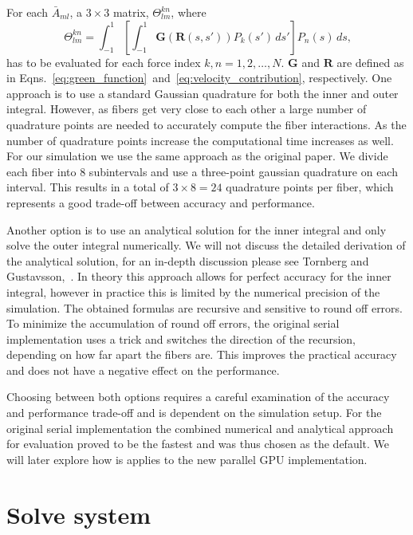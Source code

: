 For each $\bar{A}_{ml}$, a $3\times3$ matrix, $\Theta_{lm}^{kn}$, where
\begin{equation}
  \label{eq:inner_integral}
  \Theta_{lm}^{kn} = \int_{-1}^{1} \left[\int_{-1}^{1}\mathbf{G}(\mathbf{R}(s,s')) P_k(s') \, ds' \right]P_n(s) \, ds \text{,}
\end{equation}
has to be evaluated for each force index $k,n = 1,2,\dots,N$. $\mathbf{G}$ and $\mathbf{R}$ are defined as in Eqns.~\eqref{eq:green_function}~and~\eqref{eq:velocity_contribution}, respectively. One approach is to use a standard Gaussian quadrature for both the inner and outer integral. However, as fibers get very close to each other a large number of quadrature points are needed to accurately compute the fiber interactions. As the number of quadrature points increase the computational time increases as well. For our simulation we use the same approach as the original paper. We divide each fiber into 8 subintervals and use a three-point gaussian quadrature on each interval. This results in a total of $3 \times 8 = 24$ quadrature points per fiber, which represents a good trade-off between accuracy and performance.

Another option is to use an analytical solution for the inner integral and only solve the outer integral numerically. We will not discuss the detailed derivation of the analytical solution, for an in-depth discussion please see Tornberg and Gustavsson,~\cite{Tornberg2006}. In theory this approach allows for perfect accuracy for the inner integral, however in practice this is limited by the numerical precision of the simulation. The obtained formulas are recursive and sensitive to round off errors. To minimize the accumulation of round off errors, the original serial implementation uses a trick and switches the direction of the recursion, depending on how far apart the fibers are. This improves the practical accuracy and does not have a negative effect on the performance.

Choosing between both options requires a careful examination of the accuracy and performance trade-off and is dependent on the simulation setup. For the original serial implementation the combined numerical and analytical approach for evaluation proved to be the fastest and was thus chosen as the default. We will later explore how is applies to the new parallel GPU implementation.

\section{Solve system}

